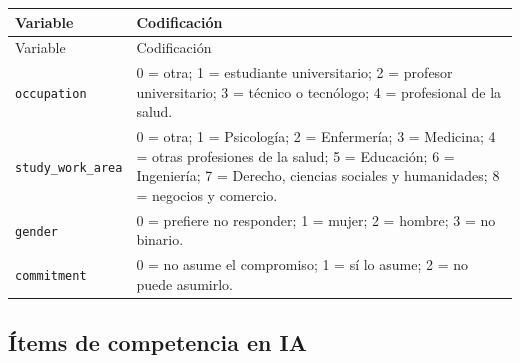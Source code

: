 \documentclass[11pt,a4paper]{article}
\begin{document}
\begin{longtable}{p{}p{}}
\toprule
Variable & Codificación \\
\midrule
\endfirsthead
\toprule
Variable & Codificación \\
\midrule
\endhead
\texttt{occupation} & 0 = otra; 1 = estudiante universitario; 2 = profesor universitario; 3 = técnico o tecnólogo; 4 = profesional de la salud. \\
\texttt{study\_work\_area} & 0 = otra; 1 = Psicología; 2 = Enfermería; 3 = Medicina; 4 = otras profesiones de la salud; 5 = Educación; 6 = Ingeniería; 7 = Derecho, ciencias sociales y humanidades; 8 = negocios y comercio. \\
\texttt{gender} & 0 = prefiere no responder; 1 = mujer; 2 = hombre; 3 = no binario. \\
\texttt{commitment} & 0 = no asume el compromiso; 1 = sí lo asume; 2 = no puede asumirlo. \\
\bottomrule
\end{longtable}

\subsection{Ítems de competencia en IA}
\end{document}
